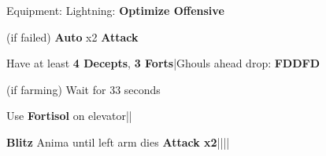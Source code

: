 \begin{menu}
	\item Equipment: Lightning: \textbf{Optimize Offensive}
\end{menu}

\begin{mainlist}
	\item {} (if failed) \textbf{Auto} x2 \to \textbf{Attack} 
	\item Have at least \textbf{4 Decepts}, \textbf{3 Forts}|Ghouls ahead drop: \textbf{FDDFD}
	\item {} (if farming) Wait for 33 seconds
	\item Use \textbf{Fortisol} on elevator||\skip
	\item {} \textbf{Blitz} Anima until left arm dies \to \textbf{Attack x2}||\save||\save
\end{mainlist}
